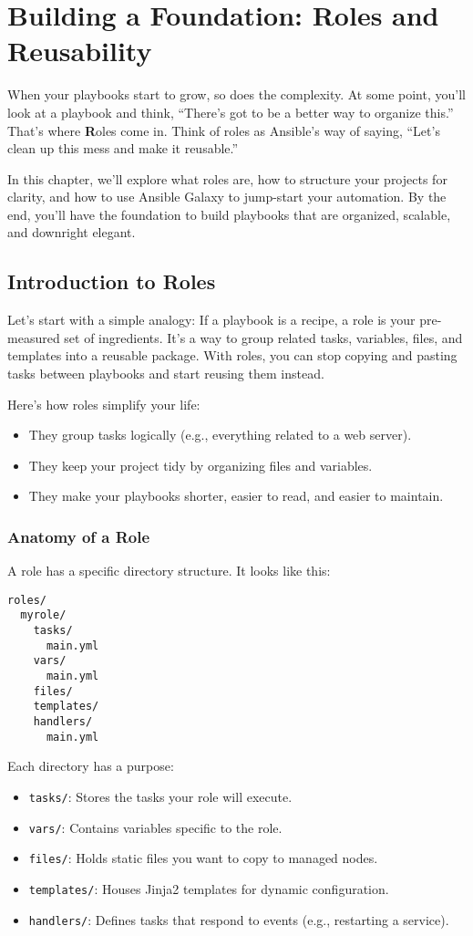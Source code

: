 \chapter{Building a Foundation: Roles and Reusability}

When your playbooks start to grow, so does the complexity. At some point, you'll look at a playbook and think, “There's got to be a better way to organize this.” That's where \textbf{R}oles come in. Think of roles as Ansible's way of saying, “Let's clean up this mess and make it reusable.”

In this chapter, we'll explore what roles are, how to structure your projects for clarity, and how to use Ansible Galaxy to jump-start your automation. By the end, you'll have the foundation to build playbooks that are organized, scalable, and downright elegant.

\section{Introduction to Roles}

Let's start with a simple analogy: If a playbook is a recipe, a role is your pre-measured set of ingredients. It's a way to group related tasks, variables, files, and templates into a reusable package. With roles, you can stop copying and pasting tasks between playbooks and start reusing them instead.

Here's how roles simplify your life:
\begin{itemize}
    \item They group tasks logically (e.g., everything related to a web server).
    \item They keep your project tidy by organizing files and variables.
    \item They make your playbooks shorter, easier to read, and easier to maintain.
\end{itemize}

\subsection{Anatomy of a Role}

A role has a specific directory structure. It looks like this:
\begin{verbatim}
roles/
  myrole/
    tasks/
      main.yml
    vars/
      main.yml
    files/
    templates/
    handlers/
      main.yml
\end{verbatim}

Each directory has a purpose:
\begin{itemize}
    \item \texttt{tasks/}: Stores the tasks your role will execute.
    \item \texttt{vars/}: Contains variables specific to the role.
    \item \texttt{files/}: Holds static files you want to copy to managed nodes.
    \item \texttt{templates/}: Houses Jinja2 templates for dynamic configuration.
    \item \texttt{handlers/}: Defines tasks that respond to events (e.g., restarting a service).
\end{itemize}

